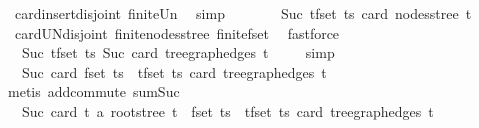 \begin{isabellebody}
\ {}{\isacharparenleft}{\kern0pt}{}{\isacharparenright}{\kern0pt}\ card{\isacharunderscore}{\kern0pt}insert{\isacharunderscore}{\kern0pt}disjoint\ finite{\isacharunderscore}{\kern0pt}Un\ \isamarkupfalse%
\ simp\isanewline
\ \ \isamarkupfalse%
\ \isamarkupfalse%
\ {\isachardoublequoteopen}{\isasymdots}\ {\isacharequal}{\kern0pt}\ Suc\ {\isacharparenleft}{\kern0pt}{\isasymSum}t{\isasymin}fset\ ts{\isachardot}{\kern0pt}\ card\ {\isacharparenleft}{\kern0pt}nodes{\isacharunderscore}{\kern0pt}stree\ t{\isacharparenright}{\kern0pt}{\isacharparenright}{\kern0pt}{\isachardoublequoteclose}\ \isamarkupfalse%
\ {}{\isacharparenleft}{\kern0pt}{}{\isacharparenright}{\kern0pt}\ card{\isacharunderscore}{\kern0pt}UN{\isacharunderscore}{\kern0pt}disjoint{\isacharprime}{\kern0pt}\ finite{\isacharunderscore}{\kern0pt}nodes{\isacharunderscore}{\kern0pt}stree\ finite{\isacharunderscore}{\kern0pt}fset\ \isamarkupfalse%
\ fastforce\isanewline
\ \ \isamarkupfalse%
\ \isamarkupfalse%
\ {\isachardoublequoteopen}{\isasymdots}\ {\isacharequal}{\kern0pt}\ Suc\ {\isacharparenleft}{\kern0pt}{\isasymSum}t{\isasymin}fset\ ts{\isachardot}{\kern0pt}\ Suc\ {\isacharparenleft}{\kern0pt}card\ {\isacharparenleft}{\kern0pt}tree{\isacharunderscore}{\kern0pt}graph{\isacharunderscore}{\kern0pt}edges\ t{\isacharparenright}{\kern0pt}{\isacharparenright}{\kern0pt}{\isacharparenright}{\kern0pt}{\isachardoublequoteclose}\ \isamarkupfalse%
\ {}\ \isamarkupfalse%
\ simp\isanewline
\ \ \isamarkupfalse%
\ \isamarkupfalse%
\ {\isachardoublequoteopen}{\isasymdots}\ {\isacharequal}{\kern0pt}\ Suc\ {\isacharparenleft}{\kern0pt}card\ {\isacharparenleft}{\kern0pt}fset\ ts{\isacharparenright}{\kern0pt}\ {\isacharplus}{\kern0pt}\ {\isacharparenleft}{\kern0pt}{\isasymSum}t{\isasymin}fset\ ts{\isachardot}{\kern0pt}\ card\ {\isacharparenleft}{\kern0pt}tree{\isacharunderscore}{\kern0pt}graph{\isacharunderscore}{\kern0pt}edges\ t{\isacharparenright}{\kern0pt}{\isacharparenright}{\kern0pt}{\isacharparenright}{\kern0pt}{\isachardoublequoteclose}\ \isamarkupfalse%
\ {\isacharparenleft}{\kern0pt}metis\ add{\isachardot}{\kern0pt}commute\ sum{\isacharunderscore}{\kern0pt}Suc{\isacharparenright}{\kern0pt}\isanewline
\ \ \isamarkupfalse%
\ \isamarkupfalse%
\ {\isachardoublequoteopen}{\isasymdots}\ {\isacharequal}{\kern0pt}\ Suc\ {\isacharparenleft}{\kern0pt}card\ {\isacharparenleft}{\kern0pt}{\isacharparenleft}{\kern0pt}{\isasymlambda}t{\isachardot}{\kern0pt}\ {\isacharbraceleft}{\kern0pt}a{\isacharcomma}{\kern0pt}\ root{\isacharunderscore}{\kern0pt}stree\ t{\isacharbraceright}{\kern0pt}{\isacharparenright}{\kern0pt}\ {\isacharbackquote}{\kern0pt}\ fset\ ts{\isacharparenright}{\kern0pt}\ {\isacharplus}{\kern0pt}\ {\isacharparenleft}{\kern0pt}{\isasymSum}t{\isasymin}fset\ ts{\isachardot}{\kern0pt}\ card\ {\isacharparenleft}{\kern0pt}tree{\isacharunderscore}{\kern0pt}graph{\isacharunderscore}{\kern0pt}edges\ t{\isacharparenright}{\kern0pt}{\isacharparenright}{\kern0pt}{\isacharparenright}{\kern0pt}{\isachardoublequoteclose}\ \isamarkupfalse%

\end{isabellebody}
